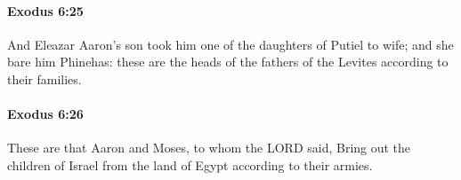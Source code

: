 		\paragraph{Exodus 6:25} %
			\label{EXODUS-6-25}

			And Eleazar Aaron's son took him one of the daughters of Putiel to wife; and she bare him Phinehas: these are the heads of the fathers of the Levites according to their families.


		\paragraph{Exodus 6:26} %
			\label{EXODUS-6-26}

			These are that Aaron and Moses, to whom the LORD said, Bring out the children of Israel from the land of Egypt according to their armies.


